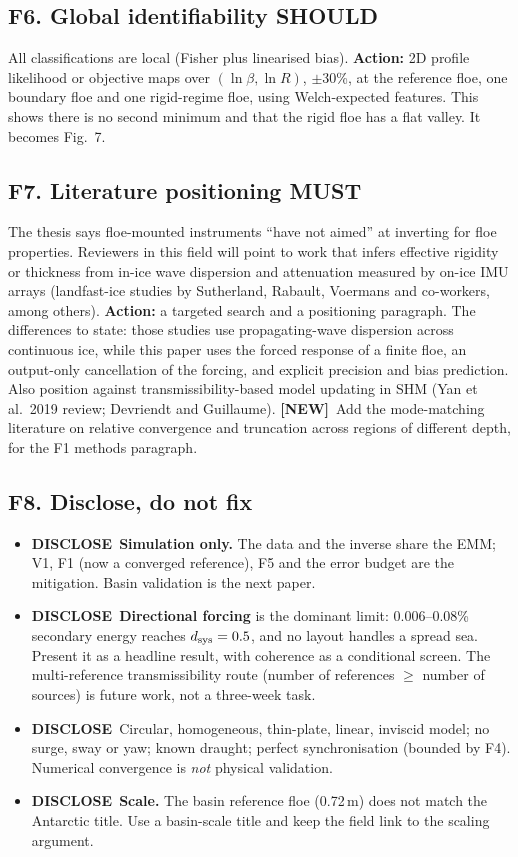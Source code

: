 \documentclass[10pt,a4paper]{article}
\newcommand{\MUST}{\textcolor{must}{\textbf{MUST}}}
\newcommand{\SHOULD}{\textcolor{should}{\textbf{SHOULD}}}
\newcommand{\DISC}{\textcolor{disc}{\textbf{DISCLOSE}}}
\newcommand{\NEW}{\textcolor{ocean}{\textbf{[NEW]}}}
\begin{document}
\subsection*{F6. Global identifiability \SHOULD}
All classifications are local (Fisher plus linearised bias). \textbf{Action:} 2D profile likelihood or objective maps over $(\ln\beta,\ln R)$, $\pm$30\%, at the reference floe, one boundary floe and one rigid-regime floe, using Welch-expected features. This shows there is no second minimum and that the rigid floe has a flat valley. It becomes Fig.~7.

\subsection*{F7. Literature positioning \MUST}
The thesis says floe-mounted instruments ``have not aimed'' at inverting for floe properties. Reviewers in this field will point to work that infers effective rigidity or thickness from in-ice wave dispersion and attenuation measured by on-ice IMU arrays (landfast-ice studies by Sutherland, Rabault, Voermans and co-workers, among others). \textbf{Action:} a targeted search and a positioning paragraph. The differences to state: those studies use propagating-wave dispersion across continuous ice, while this paper uses the forced response of a finite floe, an output-only cancellation of the forcing, and explicit precision and bias prediction. Also position against transmissibility-based model updating in SHM (Yan et al.\ 2019 review; Devriendt and Guillaume). \NEW\ Add the mode-matching literature on relative convergence and truncation across regions of different depth, for the F1 methods paragraph.

\subsection*{F8. Disclose, do not fix}
\begin{itemize}
\item \DISC\ \textbf{Simulation only.} The data and the inverse share the EMM; V1, F1 (now a converged reference), F5 and the error budget are the mitigation. Basin validation is the next paper.
\item \DISC\ \textbf{Directional forcing} is the dominant limit: 0.006--0.08\% secondary energy reaches $d_{\rm sys}=0.5$, and no layout handles a spread sea. Present it as a headline result, with coherence as a conditional screen. The multi-reference transmissibility route (number of references $\ge$ number of sources) is future work, not a three-week task.
\item \DISC\ Circular, homogeneous, thin-plate, linear, inviscid model; no surge, sway or yaw; known draught; perfect synchronisation (bounded by F4). Numerical convergence is \emph{not} physical validation.
\item \DISC\ \textbf{Scale.} The basin reference floe (0.72\,m) does not match the Antarctic title. Use a basin-scale title and keep the field link to the scaling argument.
\end{itemize}
\end{document}
